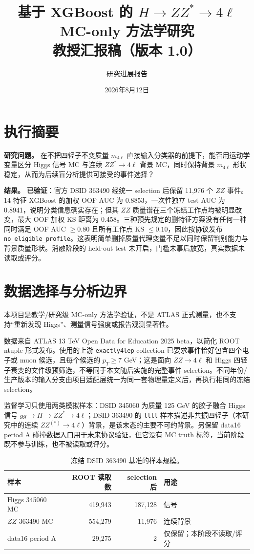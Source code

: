 \documentclass[11pt,a4paper,fontset=none]{ctexart}
\title{基于 XGBoost 的 $H\to ZZ^{*}\to4\ell$ MC-only 方法学研究\\\large 教授汇报稿（版本 1.0）}
\author{研究进展报告}
\date{2026年8月12日}
\newcommand{\verified}{\textcolor{verified}{\textbf{已验证}}}
\begin{document}
\maketitle

\section*{执行摘要}

\textbf{研究问题。} 在不把四轻子不变质量 $m_{4\ell}$ 直接输入分类器的前提下，能否用运动学变量区分 Higgs 信号 MC 与连续 $ZZ^{*}\to4\ell$ 背景 MC，同时保持背景 $m_{4\ell}$ 形状稳定，从而为后续盲分析提供可接受的事件选择？

\textbf{结果。} \verified：官方 DSID 363490 经统一 selection 后保留 11,976 个 $ZZ$ 事件。14 特征 XGBoost 的加权 OOF AUC 为 0.8853，一次性独立 test AUC 为 0.8941，说明分类信息确实存在；但其 $ZZ$ 质量谱在三个冻结工作点均被明显改变，最大 OOF 加权 KS 距离为 0.458。三种预先规定的删特征方案没有任何一种同时满足 OOF AUC $\geq0.80$ 且所有工作点 KS $\leq0.10$，因此按协议发布 \texttt{no\_eligible\_profile}。这表明简单删掉质量代理变量不足以同时保留判别能力与背景质量形状。消融阶段的 held-out test 未开启，门槛未事后放宽，真实数据未读取或评分。

\section{数据选择与分析边界}

本项目是教学/研究级 MC-only 方法学验证，不是 ATLAS 正式测量，也不支持“重新发现 Higgs”、测量信号强度或报告观测显著性。

数据来自 ATLAS 13 TeV Open Data for Education 2025 beta，以简化 ROOT ntuple 形式发布。使用的上游 \texttt{exactly4lep} collection 已要求事件恰好包含四个电子或 muon 候选，且每个候选的 $p_T\geq7$ GeV；这是面向 $ZZ\to4\ell$ 和 Higgs 四轻子衰变的文件级预筛选，不等同于本文随后实施的完整事件 selection\cite{atlas-open-data-2025}。不同年份/生产版本的输入分支由项目适配层统一为同一套物理量定义后，再执行相同的冻结 selection。

监督学习只使用两类模拟样本：DSID 345060 为质量 125 GeV 的胶子融合 Higgs 信号 $gg\to H\to ZZ^{*}\to4\ell$；DSID 363490 的 \texttt{llll} 样本描述非共振四轻子（本研究中的连续 $ZZ^{(*)}\to4\ell$）背景，是该末态的主要不可约背景。另保留 data16 period A 碰撞数据入口用于未来协议验证，但它没有 MC truth 标签，当前阶段既不参与训练，也不被读取或评分。

\begin{table}[ht]
\centering
\caption{冻结 DSID 363490 基准的样本规模。}
\begin{tabular}{lrrl}
\toprule
样本 & ROOT 读取数 & selection 后 & 用途\\
\midrule
Higgs 345060 MC & 419,943 & 187,128 & 信号\\
$ZZ$ 363490 MC & 554,279 & 11,976 & 连续背景\\
data16 period A & 29,275 & 2 & 仅保留；本阶段不读取/评分\\
\bottomrule
\end{tabular}
\end{table}
\end{document}
